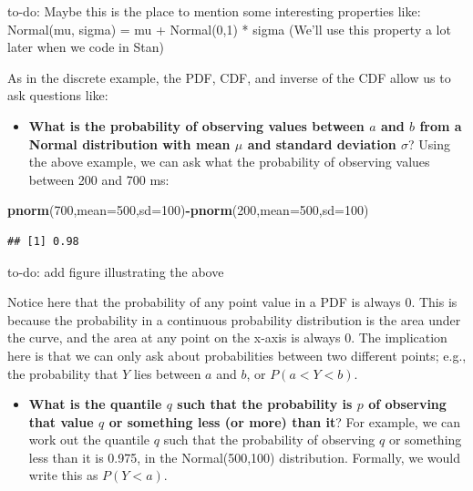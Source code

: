 \documentclass[12pt,]{krantz}
\newenvironment{Shaded}{\begin{snugshade}}{\end{snugshade}}
\newcommand{\DataTypeTok}[1]{\textcolor[rgb]{0.13,0.29,0.53}{#1}}
\newcommand{\DecValTok}[1]{\textcolor[rgb]{0.00,0.00,0.81}{#1}}
\newcommand{\KeywordTok}[1]{\textcolor[rgb]{0.13,0.29,0.53}{\textbf{#1}}}
\newcommand{\NormalTok}[1]{#1}
\newcommand{\OperatorTok}[1]{\textcolor[rgb]{0.81,0.36,0.00}{\textbf{#1}}}
\providecommand{\tightlist}{%
  \setlength{\itemsep}{0pt}\setlength{\parskip}{0pt}}
\theoremstyle{definition}
\theoremstyle{definition}
\theoremstyle{definition}
\theoremstyle{remark}
\let\BeginKnitrBlock\begin \let\EndKnitrBlock\end
\begin{document}
\BeginKnitrBlock{rmdnote}
to-do: Maybe this is the place to mention some interesting properties like:
Normal(mu, sigma) = mu + Normal(0,1) * sigma
(We'll use this property a lot later when we code in Stan)
\EndKnitrBlock{rmdnote}

As in the discrete example, the PDF, CDF, and inverse of the CDF allow us to ask questions like:

\begin{itemize}
\tightlist
\item
  \textbf{What is the probability of observing values between \(a\) and \(b\) from a Normal distribution with mean \(\mu\) and standard deviation \(\sigma\)}? Using the above example, we can ask what the probability of observing values between 200 and 700 ms:
\end{itemize}

\begin{Shaded}
\begin{Highlighting}[]
\KeywordTok{pnorm}\NormalTok{(}\DecValTok{700}\NormalTok{,}\DataTypeTok{mean=}\DecValTok{500}\NormalTok{,}\DataTypeTok{sd=}\DecValTok{100}\NormalTok{)}\OperatorTok{-}\KeywordTok{pnorm}\NormalTok{(}\DecValTok{200}\NormalTok{,}\DataTypeTok{mean=}\DecValTok{500}\NormalTok{,}\DataTypeTok{sd=}\DecValTok{100}\NormalTok{)}
\end{Highlighting}
\end{Shaded}

\begin{verbatim}
## [1] 0.98
\end{verbatim}

\BeginKnitrBlock{rmdnote}
to-do: add figure illustrating the above
\EndKnitrBlock{rmdnote}

Notice here that the probability of any point value in a PDF is always \(0\). This is because the probability in a continuous probability distribution is the area under the curve, and the area at any point on the x-axis is always \(0\). The implication here is that we can only ask about probabilities between two different points; e.g., the probability that \(Y\) lies between \(a\) and \(b\), or \(P(a<Y<b)\).

\begin{itemize}
\tightlist
\item
  \textbf{What is the quantile \(q\) such that the probability is \(p\) of observing that value \(q\) or something less (or more) than it}? For example, we can work out the quantile \(q\) such that the probability of observing \(q\) or something less than it is 0.975, in the Normal(500,100) distribution. Formally, we would write this as \(P(Y<a)\).
\end{itemize}
\end{document}
